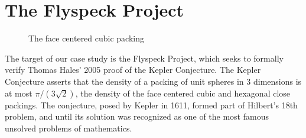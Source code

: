 \section{The Flyspeck Project}
\label{sec:flyspeck}

\begin{figure}
  \centering
  \vspace{-.95cm}
  \vspace{-1.0cm}
  \caption{The face centered cubic packing}
  \vspace{-1.0cm}
\end{figure}


The target of our case study is the Flyspeck Project, which seeks to
formally verify Thomas Hales' 2005 proof of the Kepler Conjecture.
The Kepler Conjecture asserts that the density of a packing of unit
spheres in 3 dimensions is at most $\pi/(3\sqrt{2})$, the density of the face centered
cubic and hexagonal close packings.  The conjecture, posed by Kepler
in 1611, formed part of Hilbert's 18th problem, and until its solution
was recognized as one of the most famous unsolved problems of
mathematics.

